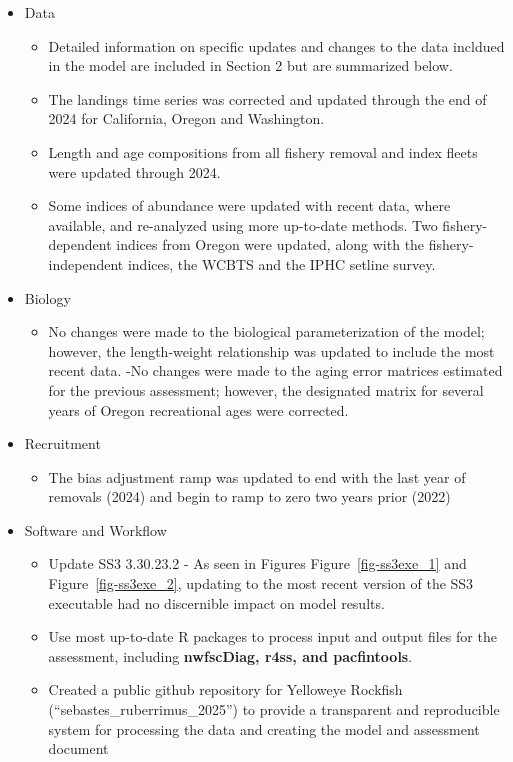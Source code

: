 \documentclass[
]{scrartcl}
\providecommand{\tightlist}{%
  \setlength{\itemsep}{0pt}\setlength{\parskip}{0pt}}\usepackage{longtable,booktabs,array}
\begin{document}
\begin{itemize}
\tightlist
\item
  Data

  \begin{itemize}
  \tightlist
  \item
    Detailed information on specific updates and changes to the data
    incldued in the model are included in Section 2 but are summarized
    below.
  \item
    The landings time series was corrected and updated through the end
    of 2024 for California, Oregon and Washington.
  \item
    Length and age compositions from all fishery removal and index
    fleets were updated through 2024.
  \item
    Some indices of abundance were updated with recent data, where
    available, and re-analyzed using more up-to-date methods. Two
    fishery-dependent indices from Oregon were updated, along with the
    fishery-independent indices, the WCBTS and the IPHC setline survey.
  \end{itemize}
\item
  Biology

  \begin{itemize}
  \tightlist
  \item
    No changes were made to the biological parameterization of the
    model; however, the length-weight relationship was updated to
    include the most recent data. -No changes were made to the aging
    error matrices estimated for the previous assessment; however, the
    designated matrix for several years of Oregon recreational ages were
    corrected.
  \end{itemize}
\item
  Recruitment

  \begin{itemize}
  \tightlist
  \item
    The bias adjustment ramp was updated to end with the last year of
    removals (2024) and begin to ramp to zero two years prior (2022)
  \end{itemize}
\item
  Software and Workflow

  \begin{itemize}
  \tightlist
  \item
    Update SS3 3.30.23.2 - As seen in Figures Figure~\ref{fig-ss3exe_1}
    and Figure~\ref{fig-ss3exe_2}, updating to the most recent version
    of the SS3 executable had no discernible impact on model results.
  \item
    Use most up-to-date R packages to process input and output files for
    the assessment, including \textbf{nwfscDiag, r4ss, and pacfintools}.
  \item
    Created a public github repository for Yelloweye Rockfish
    (``sebastes\_ruberrimus\_2025'') to provide a transparent and
    reproducible system for processing the data and creating the model
    and assessment document
  \end{itemize}
\end{itemize}
\end{document}
